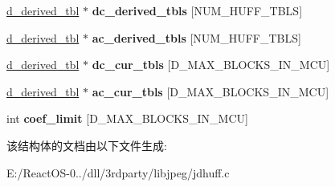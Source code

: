 \begin{DoxyCompactItemize}
\item 
\mbox{\label{structhuff__entropy__decoder_a277328a6f93b55616bd86b0056098c65}} 
\hyperlink{structd__derived__tbl}{d\+\_\+derived\+\_\+tbl} $\ast$ {\bfseries dc\+\_\+derived\+\_\+tbls} \mbox{[}N\+U\+M\+\_\+\+H\+U\+F\+F\+\_\+\+T\+B\+LS\mbox{]}
\item 
\mbox{\label{structhuff__entropy__decoder_a19edd8c7e80bfe34c21e6fe35ef90cce}} 
\hyperlink{structd__derived__tbl}{d\+\_\+derived\+\_\+tbl} $\ast$ {\bfseries ac\+\_\+derived\+\_\+tbls} \mbox{[}N\+U\+M\+\_\+\+H\+U\+F\+F\+\_\+\+T\+B\+LS\mbox{]}
\item 
\mbox{\label{structhuff__entropy__decoder_a63725587525df86501d2a632152c01c0}} 
\hyperlink{structd__derived__tbl}{d\+\_\+derived\+\_\+tbl} $\ast$ {\bfseries dc\+\_\+cur\+\_\+tbls} \mbox{[}D\+\_\+\+M\+A\+X\+\_\+\+B\+L\+O\+C\+K\+S\+\_\+\+I\+N\+\_\+\+M\+CU\mbox{]}
\item 
\mbox{\label{structhuff__entropy__decoder_af9d82cc6c9c90aa6bc3d5fc324967d7c}} 
\hyperlink{structd__derived__tbl}{d\+\_\+derived\+\_\+tbl} $\ast$ {\bfseries ac\+\_\+cur\+\_\+tbls} \mbox{[}D\+\_\+\+M\+A\+X\+\_\+\+B\+L\+O\+C\+K\+S\+\_\+\+I\+N\+\_\+\+M\+CU\mbox{]}
\item 
\mbox{\label{structhuff__entropy__decoder_a28830ac6bc49fafca8325b1ec0472a33}} 
int {\bfseries coef\+\_\+limit} \mbox{[}D\+\_\+\+M\+A\+X\+\_\+\+B\+L\+O\+C\+K\+S\+\_\+\+I\+N\+\_\+\+M\+CU\mbox{]}
\end{DoxyCompactItemize}


该结构体的文档由以下文件生成\+:\begin{DoxyCompactItemize}
\item 
E\+:/\+React\+O\+S-\/0../dll/3rdparty/libjpeg/jdhuff.\+c\end{DoxyCompactItemize}
